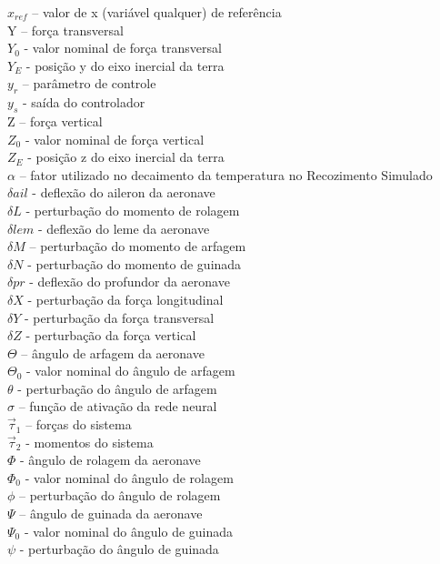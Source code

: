 \documentclass[10pt,a4paper]{article}
\numberwithin{equation}{section}
\begin{document}
$x_{ref}$ – valor de x (variável qualquer) de referência\\
Y – força transversal \\
$Y_0$ - valor nominal de força transversal\\
$Y_E$ - posição y do eixo inercial da terra\\
$y_r$ – parâmetro de controle\\
$y_s$ - saída do controlador\\
Z – força vertical \\
$Z_0$ - valor nominal de força vertical \\
$Z_E$  - posição z do eixo inercial da terra\\
$\alpha$ – fator utilizado no decaimento da temperatura no Recozimento Simulado\\
$\delta ail$ - deflexão do aileron da aeronave\\
$\delta L$ - perturbação do momento de rolagem\\
$\delta lem$ - deflexão do leme da aeronave \\
$\delta M$ – perturbação do momento de arfagem\\
$\delta N$ - perturbação do momento de guinada\\
$\delta pr$ - deflexão do profundor da aeronave \\ 
$\delta X$ - perturbação da força longitudinal\\
$\delta Y$ - perturbação da força transversal\\
$\delta Z$ - perturbação da força vertical\\
$\Theta$ – ângulo de arfagem da aeronave\\
$\Theta_0$ - valor nominal do ângulo de arfagem\\
$\theta$ - perturbação do ângulo de arfagem\\
$\sigma$ – função de ativação da rede neural\\
$\overrightarrow{\tau}_1$ – forças do sistema\\
$\overrightarrow{\tau}_2$ - momentos do sistema\\
$\Phi$ - ângulo de rolagem da aeronave\\
$\Phi_0$ - valor nominal do ângulo de rolagem\\
$\phi$ – perturbação do ângulo de rolagem\\
$\Psi$ – ângulo de guinada da aeronave\\
$\Psi_0$ - valor nominal do ângulo de guinada\\
$\psi$ - perturbação do ângulo de guinada\\
\end{document}
